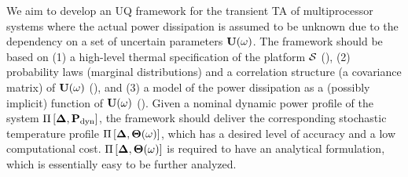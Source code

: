 We aim to develop an UQ framework for the transient TA of multiprocessor systems where the actual power dissipation is assumed to be unknown due to the dependency on a set of uncertain parameters $\mathbf{U}(\omega)$. The framework should be based on (1) a high-level thermal specification of the platform $\mathcal{S}$ (), (2) probability laws (marginal distributions) and a correlation structure (a covariance matrix) of $\mathbf{U}(\omega)$ (), and (3) a model of the power dissipation as a (possibly implicit) function of $\mathbf{U}(\omega)$ (). Given a nominal dynamic power profile of the system $\prof{\mP_\dyn}$, the framework should deliver the corresponding stochastic temperature profile $\Pi\left[\boldsymbol{\Delta}, {\boldsymbol\Theta}(\omega)\right]$, which has a desired level of accuracy and a low computational cost. $\Pi\left[\boldsymbol{\Delta}, {\boldsymbol\Theta}(\omega)\right]$ is required to have an analytical formulation, which is essentially easy to be further analyzed.
